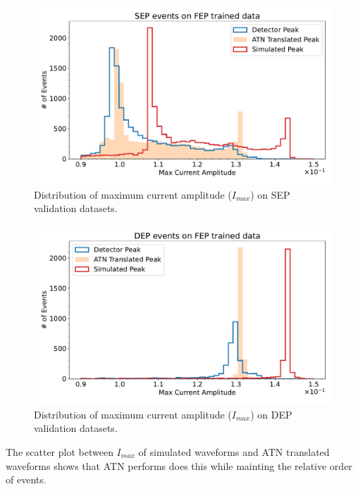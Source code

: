 \begin{figure}[htb!]
\centering
\includegraphics[width=0.99\linewidth,trim={0pc 0pc 0pc 0pc},clip]{ch8/figs/SEP_amp.pdf}
\caption{ Distribution of maximum current amplitude ($I_{max}$) on SEP validation datasets.}
\label{fig:current_amp_sep}
\end{figure}

\begin{figure}[htb!]
\centering
\includegraphics[width=0.99\linewidth,trim={0pc 0pc 0pc 0pc},clip]{ch8/figs/DEP_amp.pdf}
\caption{ Distribution of maximum current amplitude ($I_{max}$) on DEP validation datasets.}
\label{fig:current_amp_dep}
\end{figure}

The scatter plot between $I_{max}$ of simulated waveforms and ATN translated waveforms shows that ATN performs does this while mainting the relative order of events.

